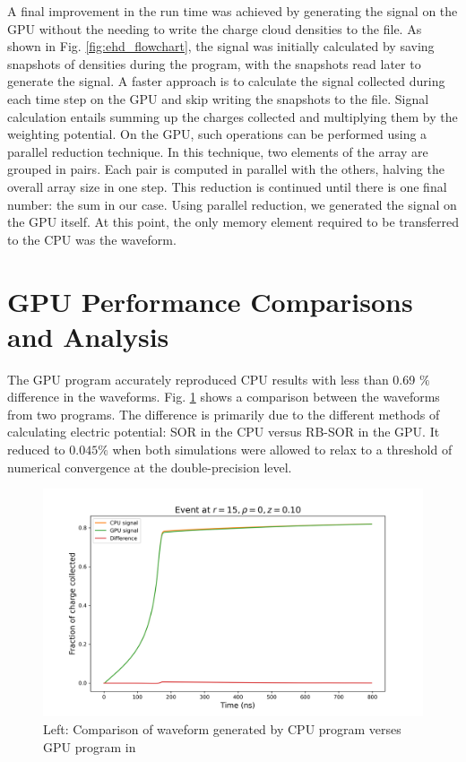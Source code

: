 A final improvement in the run time was achieved by generating the signal on the GPU without the needing to write the charge cloud densities to the file. As shown in Fig. \ref{fig:ehd_flowchart}, the signal was initially calculated by saving snapshots of densities during the program, with the snapshots read later to generate the signal. A faster approach is to calculate the signal collected during each time step on the GPU and skip writing the snapshots to the file. Signal calculation entails summing up the charges collected and multiplying them by the weighting potential. On the GPU, such operations can be performed using a parallel reduction technique. In this technique, two elements of the array are grouped in pairs. Each pair is computed in parallel with the others, halving the overall array size in one step. This reduction is continued until there is one final number: the sum in our case. Using parallel reduction, we generated the signal on the GPU itself. At this point, the only memory element required to be transferred to the CPU was the waveform.

\section{GPU Performance Comparisons and Analysis}

The GPU program accurately reproduced CPU results with less than 0.69 $\%$ difference in the waveforms. Fig. \ref{fig:waveform_comp} shows a comparison between the waveforms from two programs. The difference is primarily due to the different methods of calculating electric potential: SOR in the CPU versus RB-SOR in the GPU. It reduced to $0.045\%$ when both simulations were allowed to relax to a threshold of numerical convergence at the double-precision level.

\begin{figure}
\centering
 \includegraphics[width=0.99\linewidth]{ch4/figs/cpu_gpu_wf.png}
\caption{ Left: Comparison of waveform generated by CPU program verses GPU program in {\tdsim}}
\label{fig:waveform_comp}
\end{figure}

